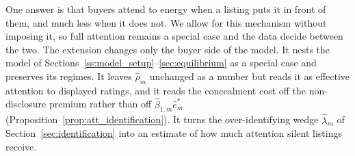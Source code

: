 One answer is that buyers attend to energy when a listing puts it in front of them, and much less when it does not. We allow for this mechanism without imposing it, so full attention remains a special case and the data decide between the two. The extension changes only the buyer side of the model. It nests the model of Sections~\ref{ss:model_setup}--\ref{sec:equilibrium} as a special case and preserves its regimes. It leaves $\hat\rho_m$ unchanged as a number but reads it as effective attention to displayed ratings, and it reads the concealment cost off the non-disclosure premium rather than off $\hat\beta_{1,m}\hat e^*_m$ (Proposition~\ref{prop:att_identification}). It turns the over-identifying wedge $\hat\lambda_m$ of Section~\ref{sec:identification} into an estimate of how much attention silent listings receive.
